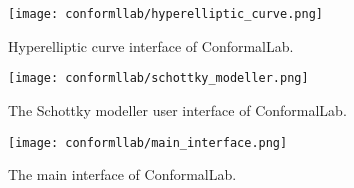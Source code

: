 \documentclass[Thesis.tex]{subfiles}
\begin{document}
\begin{wrapfigure}{R}{0.4\textwidth}
\centering
\texttt{[image: conformllab/hyperelliptic\_curve.png]}
\caption{Hyperelliptic curve interface of {\sc ConformalLab}.}
\label{fig:conformal_hyperelliptic}
\end{wrapfigure}

\begin{wrapfigure}{R}{0.4\textwidth}
\centering
\texttt{[image: conformllab/schottky\_modeller.png]}
\caption{The Schottky modeller user interface of {\sc ConformalLab}.}
\label{fig:conformal_schottky}
\end{wrapfigure}

\begin{wrapfigure}{R}{0.3\textwidth}
\centering
\texttt{[image: conformllab/main\_interface.png]}
\caption{The main interface of {\sc ConformalLab}.}
\label{fig:conformal_main}
\end{wrapfigure}



\subfilebibliography
\end{document}
